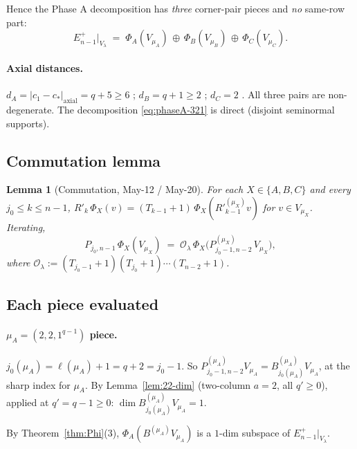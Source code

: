 \documentclass[11pt]{article}
\newtheorem{lemma}[theorem]{Lemma}
\theoremstyle{definition}
\begin{document}
Hence the Phase A decomposition has \emph{three} corner-pair pieces and
\emph{no} same-row part:
\begin{equation}\label{eq:phaseA-321}
   E_{n-1}^+|_{V_\lambda}
   \;=\;
   \Phi_A(V_{\mu_A})
   \,\oplus\, \Phi_B(V_{\mu_B})
   \,\oplus\, \Phi_C(V_{\mu_C}).
\end{equation}

\paragraph{Axial distances.}
$d_A = |c_1 - c_*|_{\text{axial}} = q + 5 \ge 6$ \checkmark;
$d_B = q + 1 \ge 2$ \checkmark; $d_C = 2$ \checkmark.
All three pairs are non-degenerate. The decomposition \eqref{eq:phaseA-321}
is direct (disjoint seminormal supports).

\subsection{Commutation lemma}

\begin{lemma}[Commutation, May-12 / May-20]\label{lem:commute-321}
For each $X \in \{A, B, C\}$ and every $j_0 \le k \le n - 1$,
$R'_k\, \Phi_X(v) = (T_{k-1}{+}1) \, \Phi_X(R'^{(\mu_X)}_{k-1} v)$
for $v \in V_{\mu_X}$. Iterating,
\begin{equation}\label{eq:commute-321}
   P_{j_0, n-1}\, \Phi_X(V_{\mu_X})
   \;=\; \mathcal{O}_\lambda
       \, \Phi_X\!\big(P^{(\mu_X)}_{j_0-1, n-2}\, V_{\mu_X}\big),
\end{equation}
where $\mathcal{O}_\lambda :=
(T_{j_0-1}{+}1)(T_{j_0}{+}1)\cdots(T_{n-2}{+}1)$.
\end{lemma}

\subsection{Each piece evaluated}

\paragraph{$\mu_A = (2, 2, 1^{q-1})$ piece.}
$j_0(\mu_A) = \ell(\mu_A) + 1 = q + 2 = j_0 - 1$. So
$P^{(\mu_A)}_{j_0 - 1, n - 2} V_{\mu_A} =
B^{(\mu_A)}_{j_0(\mu_A)} V_{\mu_A}$, at the sharp index for $\mu_A$.
By Lemma~\ref{lem:22-dim} (two-column $a = 2$, all $q' \ge 0$),
applied at $q' = q - 1 \ge 0$:
$\dim B^{(\mu_A)}_{j_0(\mu_A)} V_{\mu_A} = 1$.

By Theorem~\ref{thm:Phi}(3), $\Phi_A(B^{(\mu_A)} V_{\mu_A})$ is a
$1$-dim subspace of $E_{n-1}^+|_{V_\lambda}$.
\end{document}
